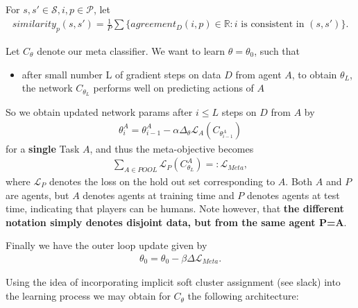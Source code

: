 \documentclass[a4paper, 11pt]{article}
\begin{document}
	
	\begin{Def}[p-similarity] {For $s,s'\in\mathcal{S},i,p\in\mathcal{P}$, let  }
		\begin{align}
			similarity_p(s,s') = \frac{1}{P}\sum \{agreement_D(i,p)\in\mathbb{R}: i \text{ is consistent in } (s,s') \}.
		\end{align}
	\end{Def}
	
	
	
	
	
	Let $C_{\theta}$ denote our meta classifier. We want to learn $\theta=\theta_0$, such that
	\begin{itemize}
		\item after small number L of gradient steps on data $D$ from agent $A$, to obtain $\theta_L$, the network $C_{\theta_L}$ performs well on predicting actions of $A$
	\end{itemize}
	So we obtain updated network params after $i\leq L$ steps on $D$ from $A$ by
	\begin{align*}
	\theta^A_i = \theta^A_{i-1} - \alpha \Delta_{\theta} \mathcal{L}_A(C_{\theta^A_{i-1}})
	\end{align*} for a \textbf{single} Task $A$, and thus the meta-objective becomes
	\begin{align*}
	\sum_{A \in POOL} \mathcal{L}_{P}(C^A_{\theta_L}) =: \mathcal{L}_{Meta}, 
	\end{align*} where $\mathcal{L}_{P}$ denotes the loss on the hold out set corresponding to $A$. Both $A$ and $P$ are agents, but $A$ denotes agents at training time and $P$ denotes agents at test time, indicating that players can be humans. Note however, that \textbf{the different notation simply denotes disjoint data, but from the same agent P=A}.
	
	Finally we have the outer loop update given by
	\begin{align*}
	\theta_0 = \theta_0 - \beta \Delta \mathcal{L}_{Meta}.
	\end{align*}
	
	Using the idea of incorporating implicit soft cluster assignment (see slack) into the learning process we may obtain for $C_\theta$ the following architecture:\\
	
\end{document}
